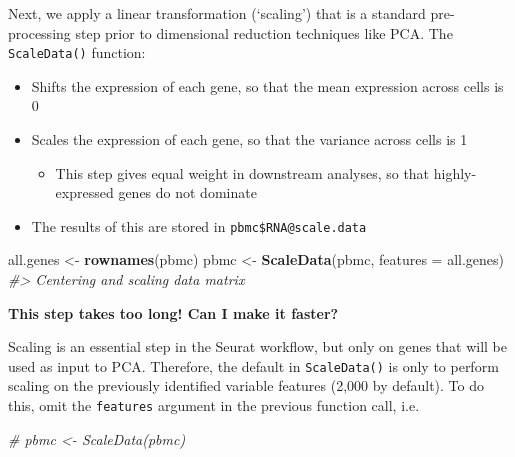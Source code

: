\documentclass[
]{book}
\newenvironment{Shaded}{\begin{snugshade}}{\end{snugshade}}
\newcommand{\AttributeTok}[1]{\textcolor[rgb]{0.13,0.29,0.53}{#1}}
\newcommand{\CommentTok}[1]{\textcolor[rgb]{0.56,0.35,0.01}{\textit{#1}}}
\newcommand{\FunctionTok}[1]{\textcolor[rgb]{0.13,0.29,0.53}{\textbf{#1}}}
\newcommand{\NormalTok}[1]{#1}
\newcommand{\OtherTok}[1]{\textcolor[rgb]{0.56,0.35,0.01}{#1}}
\providecommand{\tightlist}{%
  \setlength{\itemsep}{0pt}\setlength{\parskip}{0pt}}
\begin{document}
\hypertarget{section-5}{%
\subsubsection*{}\label{section-5}}

Next, we apply a linear transformation (`scaling') that is a standard pre-processing step prior to dimensional reduction techniques like PCA. The \texttt{ScaleData()} function:

\begin{itemize}
\tightlist
\item
  Shifts the expression of each gene, so that the mean expression across cells is 0
\item
  Scales the expression of each gene, so that the variance across cells is 1

  \begin{itemize}
  \tightlist
  \item
    This step gives equal weight in downstream analyses, so that highly-expressed genes do not dominate
  \end{itemize}
\item
  The results of this are stored in \texttt{pbmc\$RNA@scale.data}
\end{itemize}

\begin{Shaded}
\begin{Highlighting}[]
\NormalTok{all.genes }\OtherTok{\textless{}{-}} \FunctionTok{rownames}\NormalTok{(pbmc)}
\NormalTok{pbmc }\OtherTok{\textless{}{-}} \FunctionTok{ScaleData}\NormalTok{(pbmc, }\AttributeTok{features =}\NormalTok{ all.genes)}
\CommentTok{\#\textgreater{} Centering and scaling data matrix}
\end{Highlighting}
\end{Shaded}

\textbf{This step takes too long! Can I make it faster?}

Scaling is an essential step in the Seurat workflow, but only on genes that will be used as input to PCA. Therefore, the default in \texttt{ScaleData()} is only to perform scaling on the previously identified variable features (2,000 by default). To do this, omit the \texttt{features} argument in the previous function call, i.e.

\begin{Shaded}
\begin{Highlighting}[]
\CommentTok{\# pbmc \textless{}{-} ScaleData(pbmc)}
\end{Highlighting}
\end{Shaded}
\end{document}
